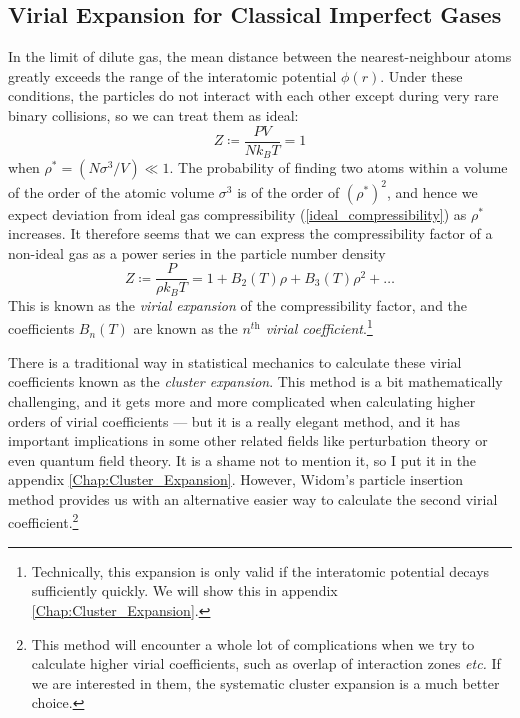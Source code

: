 \documentclass{article}
\theoremstyle{plain}\theoremheaderfont{\normalfont\bfseries}\theorembodyfont{\rmfamily}\theoremseparator{.}\newtheorem*{thm}{Theorem}\newtheorem*{law}{Law}\newtheorem*{pos}{Postulate}
\numberwithin{equation}{section}
\begin{document}
    \subsection{Virial Expansion for Classical Imperfect Gases}
    In the limit of dilute gas, the mean distance between the nearest-neighbour atoms greatly exceeds the range of the interatomic potential \(\phi(r)\). Under these conditions, the particles do not interact with each other except during very rare binary collisions, so we can treat them as ideal:
    \begin{equation}\label{ideal_compressibility}
        Z\coloneqq\frac{PV}{Nk_B T}=1
    \end{equation}
    when \(\rho^*=(N\sigma^3/V)\ll 1\). The probability of finding two atoms within a volume of the order of the atomic volume \(\sigma^3\) is of the order of \((\rho^*)^2\), and hence we expect deviation from ideal gas compressibility (\ref{ideal_compressibility}) as \(\rho^*\) increases. It therefore seems that we can express the compressibility factor of a non-ideal gas as a power series in the particle number density
    \begin{equation}
        Z\coloneqq\frac{P}{\rho k_B T}=1+B_2(T)\rho+B_3(T)\rho^2+\dots
    \end{equation}
    This is known as the \textit{virial expansion} of the compressibility factor, and the coefficients \(B_n(T)\) are known as the \textit{\(n^{\textit{th}}\) virial coefficient}.\footnote{Technically, this expansion is only valid if the interatomic potential decays sufficiently quickly. We will show this in appendix \cref{Chap:Cluster_Expansion}.}

    There is a traditional way in statistical mechanics to calculate these virial coefficients known as the \textit{cluster expansion}. This method is a bit mathematically challenging, and it gets more and more complicated when calculating higher orders of virial coefficients --- but it is a really elegant method, and it has important implications in some other related fields like perturbation theory or even quantum field theory. It is a shame not to mention it, so I put it in the appendix \cref{Chap:Cluster_Expansion}. However, Widom's particle insertion method provides us with an alternative easier way to calculate the second virial coefficient.\footnote{This method will encounter a whole lot of complications when we try to calculate higher virial coefficients, such as overlap of interaction zones \textit{etc.} If we are interested in them, the systematic cluster expansion is a much better choice.}
\end{document}
